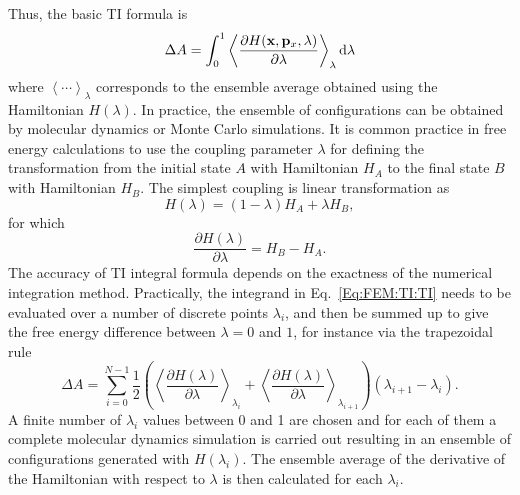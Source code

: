 Thus, the basic TI formula is
\begin{equation}
\Delta A = \int_{0}^{1}\left \langle \frac{\partial{H(\mathbf{x},\mathbf{p}_{x},\lambda)}}{\partial{\lambda}} \right \rangle_{\lambda} \mathop{}\!\mathrm{d}\lambda
\label{Eq:FEM:TI:TI}
\end{equation} 
where $\left \langle \cdots \right \rangle _{\lambda}$ corresponds to the ensemble average obtained using the Hamiltonian $H(\lambda)$. In practice, the ensemble of configurations can be obtained by molecular dynamics or Monte Carlo simulations. It is common practice in free energy calculations to use the coupling parameter $\lambda$ for defining the transformation from the initial state $A$ with Hamiltonian $H_{A}$ to the final state $B$ with Hamiltonian $H_{B}$. The simplest coupling is linear transformation as
\begin{equation}
H(\lambda) = (1-\lambda) H_{A} + \lambda H_{B},
\end{equation}
for which
\begin{equation}
	\frac{\partial{H(\lambda)}}{\partial{\lambda}}=H_B-H_A. 
\end{equation}
The accuracy of TI integral formula depends on the exactness of the numerical integration method.\cite{PaliwalJCTC2011} Practically, the integrand in Eq.~\ref{Eq:FEM:TI:TI} needs to be evaluated over a number of discrete points $\lambda_{i}$, and then be summed up to give the free energy difference between $\lambda=0$ and $1$, for instance via the trapezoidal rule
\begin{equation}
\Delta A = \sum_{i=0}^{N-1}\frac{1}{2}\left(\left \langle \frac{\partial{H(\lambda)}}{\partial{\lambda}} \right \rangle_{\lambda_{i}} + \left \langle\frac{\partial{H(\lambda)}}{\partial{\lambda}} \right \rangle_{\lambda_{i+1}}\right)
(\lambda_{i+1}-\lambda_i).
\label{Eq:FEM:TI:dTI}
\end{equation} 
A finite number of $\lambda_{i}$ values between 0 and 1 are chosen and for each of them a complete molecular dynamics simulation is carried out resulting in an ensemble of configurations generated with $H(\lambda_{i})$.
The ensemble average of the derivative of the Hamiltonian with respect to $\lambda$ is then calculated for each $\lambda_{i}$.
	
